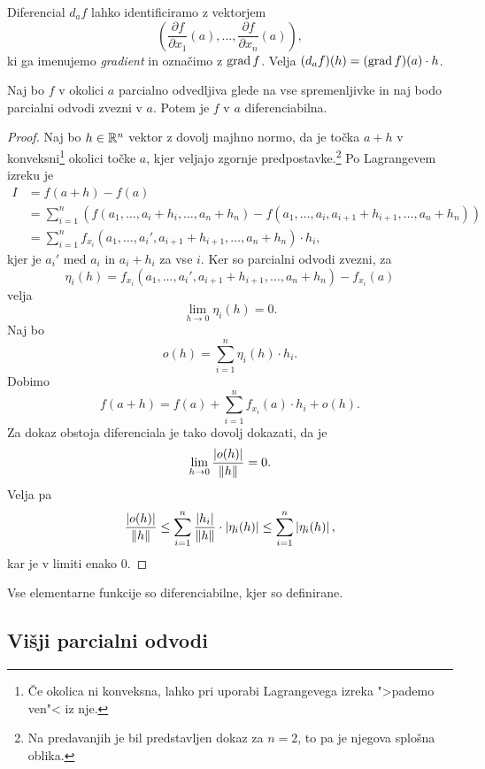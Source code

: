 \begin{opomba}
Diferencial $d_af$ lahko identificiramo z vektorjem
\[
\left(\frac{\partial f}{\partial x_1}(a),\dots,\frac{\partial f}{\partial x_n}(a)\right),
\]
ki ga imenujemo \emph{gradient} in označimo z $\operatorname{grad} f$. Velja $(d_af)(h)=(\operatorname{grad} f)(a)\cdot h$.
\end{opomba}

\begin{izrek}
Naj bo $f$ v okolici $a$ parcialno odvedljiva glede na vse spremenljivke in naj bodo parcialni odvodi zvezni v $a$. Potem je $f$ v $a$ diferenciabilna.
\end{izrek}

\begin{proof}
Naj bo $h\in\mathbb{R}^n$ vektor z dovolj majhno normo, da je točka $a+h$ v konveksni\footnote{Če okolica ni konveksna, lahko pri uporabi Lagrangevega izreka ">pademo ven"< iz nje.} okolici točke $a$, kjer veljajo zgornje predpostavke.\footnote{Na predavanjih je bil predstavljen dokaz za $n=2$, to pa je njegova splošna oblika.} Po Lagrangevem izreku je
\begin{align*}
I&=f(a+h)-f(a)
\\
&=\sum_{i=1}^n\left(f(a_1,\dots, a_i+h_i,\dots,a_n+h_n)-f(a_1,\dots, a_i,a_{i+1}+h_{i+1},\dots,a_n+h_n)\right)
\\
&=\sum_{i=1}^n f_{x_i}(a_1,\dots,a_i',a_{i+1}+h_{i+1},\dots,a_n+h_n)\cdot h_i,
\end{align*}
kjer je $a_i'$ med $a_i$ in $a_i+h_i$ za vse $i$. Ker so parcialni odvodi zvezni, za
\[
\eta_i(h)=f_{x_i}(a_1,\dots,a_i',a_{i+1}+h_{i+1},\dots,a_n+h_n)-f_{x_i}(a)
\]
velja
\[
\lim_{h\to 0}\eta_i(h)=0.
\]
Naj bo
\[
o(h)=\sum_{i=1}^n\eta_i(h)\cdot h_i.
\]
Dobimo
\[
f(a+h)=f(a)+\sum_{i=1}^n f_{x_i}(a)\cdot h_i+o(h).
\]
Za dokaz obstoja diferenciala je tako dovolj dokazati, da je
\[
\lim_{h\to 0}\frac{\left\lvert o(h)\right\rvert}{\left\lVert h\right\rVert}=0.
\]
Velja pa
\[
\frac{\left\lvert o(h)\right\rvert}{\left\lVert h\right\rVert}\leq\sum_{i=1}^n\frac{\left\lvert h_i\right\rvert}{\left\lVert h\right\rVert}\cdot\left\lvert \eta_i(h)\right\rvert\leq\sum_{i=1}^n \left\lvert \eta_i(h)\right\rvert,
\]
kar je v limiti enako $0$.
\end{proof}

\begin{posledica}
Vse elementarne funkcije so diferenciabilne, kjer so definirane.
\end{posledica}

\newpage

\subsection{Višji parcialni odvodi}

